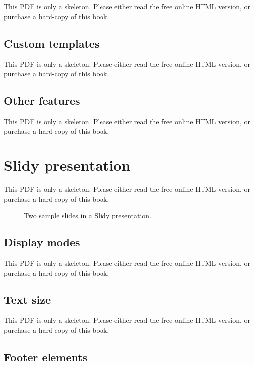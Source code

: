 \documentclass[
  11pt,
]{krantz}
\theoremstyle{definition}
\theoremstyle{definition}
\theoremstyle{definition}
\theoremstyle{definition}
\theoremstyle{remark}
\begin{document}
This PDF is only a skeleton. Please either read the free online HTML version, or purchase a hard-copy of this book.

\subsection{Custom templates}\label{custom-templates-2}

This PDF is only a skeleton. Please either read the free online HTML version, or purchase a hard-copy of this book.

\subsection{Other features}\label{other-features-5}

This PDF is only a skeleton. Please either read the free online HTML version, or purchase a hard-copy of this book.

\section{Slidy presentation}\label{slidy-presentation}

This PDF is only a skeleton. Please either read the free online HTML version, or purchase a hard-copy of this book.

\begin{figure}\caption{Two sample slides in a Slidy presentation.}\end{figure}

\subsection{Display modes}\label{display-modes-1}

This PDF is only a skeleton. Please either read the free online HTML version, or purchase a hard-copy of this book.

\subsection{Text size}\label{text-size}

This PDF is only a skeleton. Please either read the free online HTML version, or purchase a hard-copy of this book.

\subsection{Footer elements}\label{footer-elements}
\end{document}

